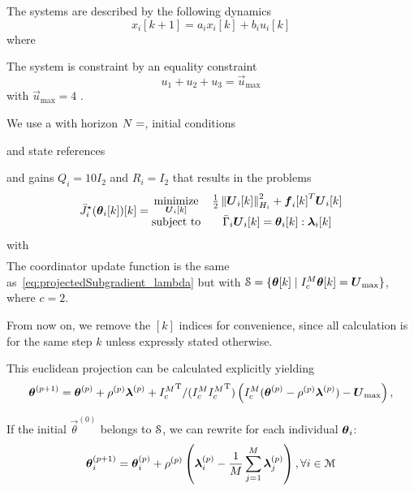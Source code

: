 \documentclass[../main.tex]{subfiles}
\begin{document}
The systems are described by the following \ltidt{} dynamics
\begin{equation}
  \label{eq:example_dynamics}
  x_{i}[k+1]=a_{i}x_{i}[k]+b_{i}u_{i}[k]
\end{equation}
where

The system is
constraint by an equality constraint
\begin{equation}
  \label{eq:example_equality}
  u_{1}+u_{2}+u_{3}=\vec{u}_{\max}
\end{equation}
with
$\vec{u}_{\max}=4$
.

We use a \dmpc{} with horizon ${N=}$,
initial conditions

and state references

and gains
$Q_{i}=10I_{2}$ and
$R_{i}=   I_{2}$
that results in the problems
\begin{equation}
    \eqoptobji(\thetaik)[k]=
    \begin{matrix}
    \minimize\limits_{\vec{U}_{i}[k]}&\frac{1}{2}\norm{\vec{U}_{i}[k]}^{2}_{H_{i}} + {\vec{f}_{i}[k]}^{T}\vec{U}_{i}[k]\\
    \mathrm{subject~ to} & \bar{\Gamma}_{i}\vec{U}_{i}[k] = \thetaik:\lambdaik
  \end{matrix}
  \label{eq:example_local_problem}
\end{equation}
with
\begin{equation}
  \label{eq:1}
  \begin{array}{lll}
    
  \end{array}
\end{equation}
The coordinator update function is the same as~\eqref{eq:projectedSubgradient_lambda} but with ${\mathcal{S} = \{\boldsymbol{\theta}[k]\mid I_{c}^{M}\boldsymbol{\theta}[k] = \boldsymbol{U}_{\max}\}}$, where $c=2$.

From now on, we remove the $[k]$ indices for convenience, since all calculation is for the same step $k$ unless expressly stated otherwise.

This euclidean projection can be calculated explicitly yielding
\begin{equation}
  \label{eq:euclidean_projection_equality_solution}
    \boldsymbol{\theta}^{(p+1)}=\boldsymbol{\theta}^{(p)}+\rho^{(p)}\boldsymbol{\lambda}^{(p)}+{I_{c}^M}^{\mathrm{T}}/({I_{c}^M} {I_{c}^M}^{\mathrm{T}})\left({I_{c}^M}(\boldsymbol{\theta}^{(p)}-\rho^{(p)}\boldsymbol{\lambda}^{(p)}) -\boldsymbol{U}_{\max}\right),
\end{equation}

If the initial ${\vec{\theta}}^{(0)}$ belongs to $\mathcal{S}$, we can rewrite for each individual $\boldsymbol{\theta}_i$:
\begin{equation}
  \label{eq:example_projectedSubgradient_lambda}
 \boldsymbol{\theta}_i^{(p+1)}=\boldsymbol{\theta}_i^{(p)}+\rho^{(p)}\left(\boldsymbol{\lambda}_i^{(p)}-\frac{1}{M}\sum_{j=1}^{M}\boldsymbol{\lambda}_j^{(p)}\right),\forall i\in\mathcal{M}
\end{equation}
\end{document}
